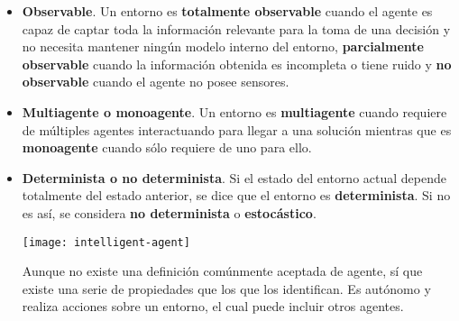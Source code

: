 \begin{itemize}
	\item \textbf{Observable}. Un entorno es \textbf{totalmente observable} cuando el agente es capaz de captar toda la información relevante para la toma de una decisión y no necesita mantener ningún modelo interno del entorno, \textbf{parcialmente observable} cuando la información obtenida es incompleta o tiene ruido y \textbf{no observable} cuando el agente no posee sensores.
	\item \textbf{Multiagente o monoagente}. Un entorno es \textbf{multiagente} cuando requiere de múltiples agentes interactuando para llegar a una solución mientras que es \textbf{monoagente} cuando sólo requiere de uno para ello.
	\item \textbf{Determinista o no determinista}. Si el estado del entorno actual depende totalmente del estado anterior, se dice que el entorno es \textbf{determinista}. Si no es así, se considera \textbf{no determinista} o \textbf{estocástico}.

\begin{marginfigure}
	\texttt{[image: intelligent-agent]}
	\caption[Esquema general de un agente]{Aunque no existe una definición comúnmente aceptada de agente, sí que existe una serie de propiedades que los que los identifican. Es autónomo y realiza acciones sobre un entorno, el cual puede incluir otros agentes.}
	\label{fig:intelligent-agent}


\end{marginfigure}
\end{itemize}
